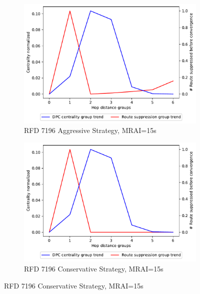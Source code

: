 \begin{figure}[H]
\begin{subfigure}[b]{0.325\textwidth}
     \end{subfigure}
     \hfill
     \begin{subfigure}[b]{0.325\textwidth}
         \centering
         \includegraphics[width=\textwidth]{images/RFD/miceVSelephants/MultiMRAI/15/elephants/cisco_1000_RFD_7196_aggressive_nodeConvergence_centVSsup_trend.pdf}
         \caption{RFD 7196 Aggressive Strategy, MRAI=15s}
         \label{fig:1000_7196RFDA_centVSsup_elephants}
     \end{subfigure}
     \hfill
     \begin{subfigure}[b]{0.325\textwidth}
         \centering
         \includegraphics[width=\textwidth]{images/RFD/miceVSelephants/MultiMRAI/15/elephants/cisco_1000_RFD_7196_conservative_nodeConvergence_centVSsup_trend.pdf}
         \caption{RFD 7196 Conservative Strategy, MRAI=15s}
         \label{fig:1000_7196RFDC_centVSsup_elephants}

\end{subfigure}
\end{figure}
